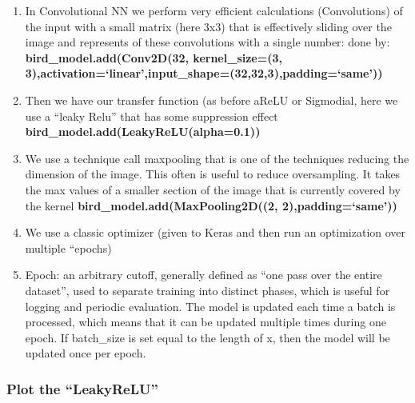 \documentclass[
  letterpaper,
  DIV=11,
  numbers=noendperiod]{scrartcl}
\providecommand{\tightlist}{%
  \setlength{\itemsep}{0pt}\setlength{\parskip}{0pt}}\usepackage{longtable,booktabs,array}
\begin{document}
\begin{enumerate}
\def\labelenumi{\arabic{enumi}.}
\tightlist
\item
  In Convolutional NN we perform very efficient calculations
  (Convolutions) of the input with a small matrix (here 3x3) that is
  effectively sliding over the image and represents of these
  convolutions with a single number: done by:
  \textbf{bird\_model.add(Conv2D(32, kernel\_size=(3,
  3),activation=`linear',input\_shape=(32,32,3),padding=`same'))}
\item
  Then we have our transfer function (as before aReLU or Sigmodial, here
  we use a ``leaky Relu'' that has some suppression effect
  \textbf{bird\_model.add(LeakyReLU(alpha=0.1))}
\item
  We use a technique call maxpooling that is one of the techniques
  reducing the dimension of the image. This often is useful to reduce
  oversampling. It takes the max values of a smaller section of the
  image that is currently covered by the kernel
  \textbf{bird\_model.add(MaxPooling2D((2, 2),padding=`same'))}
\item
  We use a classic optimizer (given to Keras and then run an
  optimization over multiple ``epochs)
\item
  Epoch: an arbitrary cutoff, generally defined as ``one pass over the
  entire dataset'', used to separate training into distinct phases,
  which is useful for logging and periodic evaluation. The model is
  updated each time a batch is processed, which means that it can be
  updated multiple times during one epoch. If batch\_size is set equal
  to the length of x, then the model will be updated once per epoch.
\end{enumerate}

\subsubsection{Plot the ``LeakyReLU''}\label{plot-the-leakyrelu}
\end{document}
